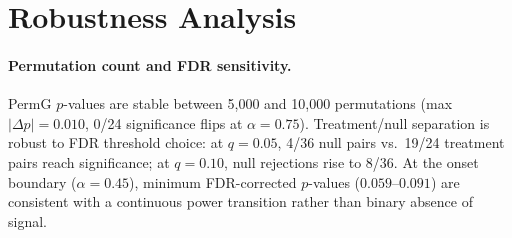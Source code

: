 \begin{table}[t]
\centering
\small
\caption{Observation window sensitivity for Tier~3 consensus ($K{\geq}4/5$) at $\alpha{=}1.0$ (Pythia-410M, 4~seeds). Tier~3 pairs: number of canary$\to$downstream pairs (out of 8 validated) reaching $K{\geq}4/5$ method agreement. TY pairs: number of effect-size reference pairs (out of 6) reaching Toda--Yamamoto significance (moderate supplementary method; \S\ref{sec:method}). Consensus stabilizes at $T_{\min}{\geq}5$; TY stabilizes at $T_{\min}{\geq}6$.}
\label{tab:window_sensitivity}
\end{table}

\FloatBarrier
\section{Robustness Analysis}
\label{app:robustness}
\label{app:spec_curve}

\paragraph{Permutation count and FDR sensitivity.}
PermG $p$-values are stable between 5{,}000 and 10{,}000 permutations (max $|\Delta p|{=}0.010$, 0/24 significance flips at $\alpha{=}0.75$).
Treatment/null separation is robust to FDR threshold choice: at $q{=}0.05$, 4/36 null pairs vs.\ 19/24 treatment pairs reach significance; at $q{=}0.10$, null rejections rise to 8/36.
At the onset boundary ($\alpha{=}0.45$), minimum FDR-corrected $p$-values ($0.059$--$0.091$) are consistent with a continuous power transition rather than binary absence of signal.

